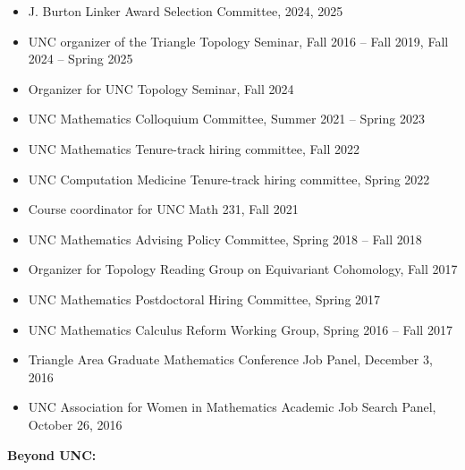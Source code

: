\documentclass[10pt]{article}
\begin{document}
\begin{itemize}
\item J. Burton Linker Award Selection Committee, 2024, 2025

\item UNC organizer of the Triangle Topology Seminar, Fall 2016 -- Fall 2019, Fall 2024 -- Spring 2025

\item Organizer for UNC Topology Seminar, Fall 2024

\item UNC Mathematics Colloquium Committee, Summer 2021 -- Spring 2023

\item UNC Mathematics Tenure-track hiring committee, Fall 2022

\item UNC Computation Medicine Tenure-track hiring committee, Spring 2022

\item Course coordinator for UNC Math 231, Fall 2021

\item UNC Mathematics Advising Policy Committee, Spring 2018 -- Fall 2018

\item Organizer for Topology Reading Group on Equivariant Cohomology, Fall 2017

\item UNC Mathematics Postdoctoral Hiring Committee, Spring 2017

\item UNC Mathematics Calculus Reform Working Group, Spring 2016 -- Fall 2017

\item Triangle Area Graduate Mathematics Conference Job Panel, December 3, 2016

\item UNC Association for Women in Mathematics Academic Job Search Panel, October 26, 2016

\end{itemize}


\noindent\textbf{Beyond UNC:}
\end{document}
